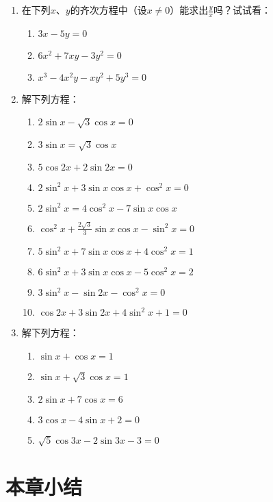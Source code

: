 \begin{enumerate}
    \item 在下列$x$、$y$的齐次方程中（设$x\ne 0$）能求出$\frac{y}{x}$吗？试试看：
\begin{multicols}{2}
    \begin{enumerate}[(1)]
        \item $3x-5y=0$
        \item $6x^2+7xy-3y^2=0$
        \item $x^3-4x^2y-xy^2+5y^3=0$
    \end{enumerate}    
\end{multicols}

\item 解下列方程：
\begin{enumerate}[(1)]
    \item $2\sin x-\sqrt{3}\cos x=0$
    \item $3\sin x=\sqrt{3}\cos x$
    \item $5\cos 2x+2\sin2x=0$
    \item $2\sin^2 x+3\sin x\cos x+\cos^2x=0$
    \item $2\sin^{2}x=4\cos^{2}x-7\sin x\cos x$
    \item $\cos^{2}x+\frac{2\sqrt{3}}{3}\sin x\cos x-\sin^{2}x=0$
    \item $5\sin^{2}x+7\sin x\cos x+4\cos^{2}x=1$
    \item $6\sin^{2}x+3\sin x\cos x-5\cos^{2}x=2$
    \item $3\sin^{2}x-\sin2x-\cos^{2}x=0$
    \item $\cos2x+3\sin2x+4\sin^{2}x+1=0$
\end{enumerate}

\item 解下列方程：
\begin{multicols}{2}
\begin{enumerate}[(1)]
\item $\sin x+\cos x=1$
\item $\sin x+\sqrt{3}\cos x=1$
\item $2\sin x+7\cos x=6$
\item $3\cos x-4\sin x+2=0$
\item $\sqrt{5}\cos 3x-2\sin 3x-3=0$
\end{enumerate}    
\end{multicols}
\end{enumerate}


\section{本章小结}

